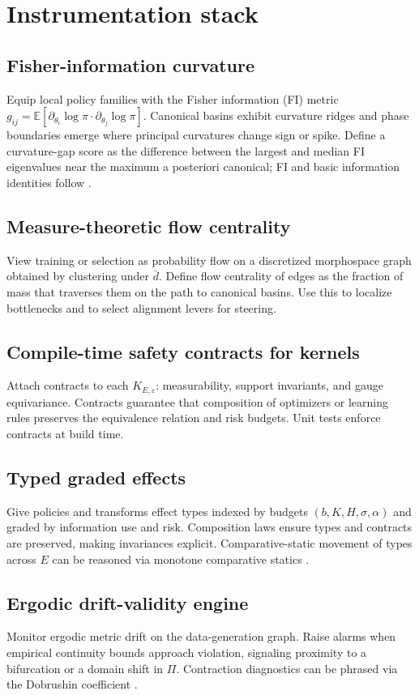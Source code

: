 \documentclass[11pt]{article}
\newcommand{\E}{\mathbb{E}}
\newcommand{\1}{\mathbbm{1}}
\begin{document}
\section{Instrumentation stack}
\subsection{Fisher-information curvature}
Equip local policy families with the Fisher information (FI) metric $g_{ij} = \E[\partial_{\theta_i}\log \pi \cdot \partial_{\theta_j}\log \pi]$. Canonical basins exhibit curvature ridges and phase boundaries emerge where principal curvatures change sign or spike. Define a curvature-gap score as the difference between the largest and median FI eigenvalues near the maximum a posteriori canonical; FI and basic information identities follow \parencite{CoverThomas2006}.

\subsection{Measure-theoretic flow centrality}
View training or selection as probability flow on a discretized morphospace graph obtained by clustering under $\bar d$. Define flow centrality of edges as the fraction of mass that traverses them on the path to canonical basins. Use this to localize bottlenecks and to select alignment levers for steering.

\subsection{Compile-time safety contracts for kernels}
Attach contracts to each $K_{E,\varepsilon}$: measurability, support invariants, and gauge equivariance. Contracts guarantee that composition of optimizers or learning rules preserves the equivalence relation and risk budgets. Unit tests enforce contracts at build time.

\subsection{Typed graded effects}
Give policies and transforms effect types indexed by budgets $(b,K,H,\sigma,\alpha)$ and graded by information use and risk. Composition laws ensure types and contracts are preserved, making invariances explicit. Comparative-static movement of types across $E$ can be reasoned via monotone comparative statics \parencite{Topkis1998,MilgromShannon1994}.

\subsection{Ergodic drift-validity engine}
Monitor ergodic metric drift on the data-generation graph. Raise alarms when empirical continuity bounds approach violation, signaling proximity to a bifurcation or a domain shift in $\Pi$. Contraction diagnostics can be phrased via the Dobrushin coefficient \parencite{Dobrushin1956}.
\end{document}
